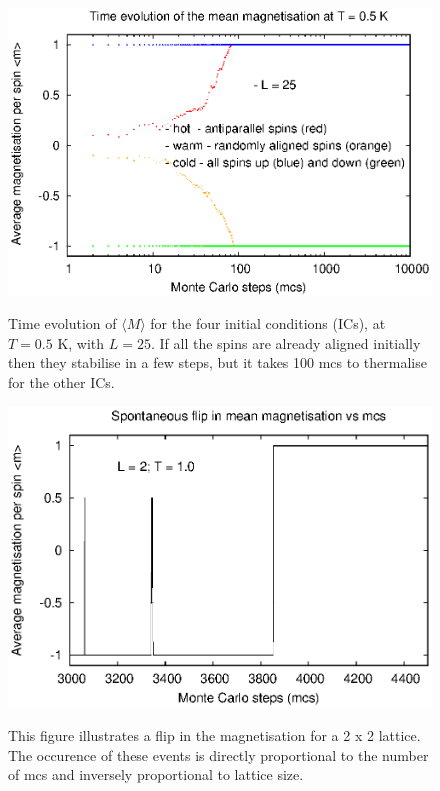 \documentclass[a4paper]{article}
\begin{document}
\begin{figure}[h]
\centering
\begin{minipage}[b]{0.45\linewidth}
\includegraphics[width=1\textwidth]{subcritical.eps}
\label{fig:minipage1}
\caption{Time evolution of $ \langle M \rangle$ for the four initial conditions (ICs), at $T = 0.5$ K, with $L =25$. If all the spins are already aligned initially then they stabilise in a few steps, but it takes 100 mcs to thermalise for the other ICs.}
\end{minipage}
\quad
\begin{minipage}[b]{0.45\linewidth}
\includegraphics[width=1\textwidth]{flip.eps}
\label{fig:minipage2}
\caption{This figure illustrates a flip in the magnetisation for a 2 x 2 lattice. The occurence of these events is directly proportional to the number of mcs and inversely proportional to lattice size. }
\end{minipage}
\end{figure}
\end{document}

